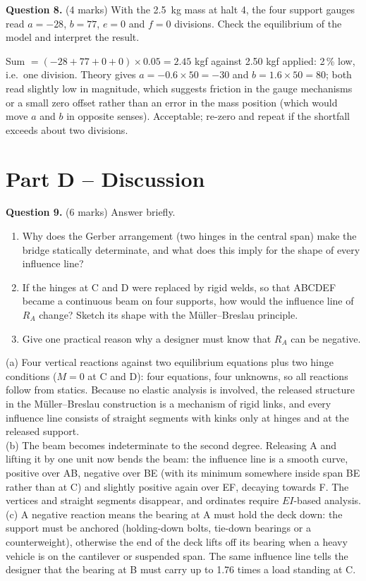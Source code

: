 \documentclass[11pt,a4paper]{article}
\newif\ifkey \keyfalse \ifdefined\showkey\keytrue\fi
\newcommand{\qmarks}[1]{ {\small(#1 marks)}}
\newcommand{\workspace}[1]{\ifkey\else\vspace{#1}\fi}
\begin{document}
\textbf{Question 8.}\qmarks{4} With the \SI{2.5}{kg} mass at halt 4, the four support gauges read $a = -28$, $b = 77$, $e = 0$ and $f = 0$ divisions. Check the equilibrium of the model and interpret the result.
\workspace{2.5cm}
\begin{answer}
Sum $= (-28 + 77 + 0 + 0) \times 0.05 = 2.45$ kgf against 2.50 kgf applied: 2\,\% low, i.e.\ one division. Theory gives $a = -0.6 \times 50 = -30$ and $b = 1.6 \times 50 = 80$; both read slightly low in magnitude, which suggests friction in the gauge mechanisms or a small zero offset rather than an error in the mass position (which would move $a$ and $b$ in opposite senses). Acceptable; re-zero and repeat if the shortfall exceeds about two divisions.
\end{answer}

\section*{Part D -- Discussion}

\textbf{Question 9.}\qmarks{6} Answer briefly.
\begin{enumerate}[label=(\alph*)]
  \item Why does the Gerber arrangement (two hinges in the central span) make the bridge statically determinate, and what does this imply for the shape of every influence line?
  \item If the hinges at C and D were replaced by rigid welds, so that ABCDEF became a continuous beam on four supports, how would the influence line of $R_A$ change? Sketch its shape with the Müller--Breslau principle.
  \item Give one practical reason why a designer must know that $R_A$ can be negative.
\end{enumerate}
\workspace{4cm}
\begin{answer}
(a) Four vertical reactions against two equilibrium equations plus two hinge conditions ($M = 0$ at C and D): four equations, four unknowns, so all reactions follow from statics. Because no elastic analysis is involved, the released structure in the Müller--Breslau construction is a mechanism of rigid links, and every influence line consists of straight segments with kinks only at hinges and at the released support.\\
(b) The beam becomes indeterminate to the second degree. Releasing A and lifting it by one unit now bends the beam: the influence line is a smooth curve, positive over AB, negative over BE (with its minimum somewhere inside span BE rather than at C) and slightly positive again over EF, decaying towards F. The vertices and straight segments disappear, and ordinates require $EI$-based analysis.\\
(c) A negative reaction means the bearing at A must hold the deck down: the support must be anchored (holding-down bolts, tie-down bearings or a counterweight), otherwise the end of the deck lifts off its bearing when a heavy vehicle is on the cantilever or suspended span. The same influence line tells the designer that the bearing at B must carry up to 1.76 times a load standing at C.
\end{answer}
\end{document}
